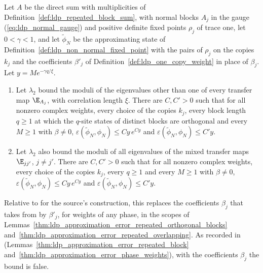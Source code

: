 \begin{lemma}
    \label{thm:ldp_approximation_error_one_copy}
    \leanok
    Let $A$ be the direct sum with multiplicities of
    Definition~\ref{def:ldp_repeated_block_sum}, with normal blocks $A_j$ in the gauge
    (\ref{eq:ldp_normal_gauge}) and positive definite fixed points $\rho_j$ of trace one,
    let $0<\gamma<1$, and let $\widetilde\phi_N$ be the approximating state of
    Definition~\ref{def:ldp_non_normal_fixed_point} with the pairs of $\rho_j$ on the
    copies $k_j$ and the coefficients $\beta'_j$ of
    Definition~\ref{def:ldp_one_copy_weight} in place of $\beta_j$. Let
    $y=Me^{-\gamma q/\xi}$.
    \begin{enumerate}
        \item Let $\lambda_2$ bound the moduli of the eigenvalues other than one of every
              transfer map $\E_{A_j}$, with correlation length $\xi$. There are
              $C,C'>0$ such that for all nonzero complex weights, every choice of the
              copies $k_j$, every block length $q\geq1$ at which the $q$-site
              states of distinct blocks are orthogonal and every $M\geq1$ with
              $\beta\neq0$, $\varepsilon(\widetilde\phi_N,\phi_N)\leq Cy\,e^{Cy}$ and
              $\varepsilon(\widetilde\phi_N,\phi_N)\leq C'y$.
        \item Let $\lambda_2$ also bound the moduli of all eigenvalues of the mixed
              transfer maps $\E_{jj'}$, $j\neq j'$. There are $C,C'>0$ such that for all
              nonzero complex weights, every choice of the copies $k_j$, every $q\geq1$
              and every $M\geq1$ with $\beta\neq0$,
              $\varepsilon(\widetilde\phi_N,\phi_N)\leq Cy\,e^{Cy}$ and
              $\varepsilon(\widetilde\phi_N,\phi_N)\leq C'y$.
    \end{enumerate}
    Relative to \cite[Lemma~1$'$(ii)]{Malz2024Preparation} for the source's construction,
    this replaces the coefficients $\beta_j$ that
    \cite[eq.~(S7)]{Malz2024Preparation} takes from
    \cite[eq.~(S4)]{Malz2024Preparation} by $\beta'_j$, for weights of any phase, in the
    scopes of Lemmas~\ref{thm:ldp_approximation_error_repeated_orthogonal_blocks}
    and~\ref{thm:ldp_approximation_error_repeated_overlapping}. As recorded in
    \cite{gap:mswc24_repeated_block_corrected_state}
    (Lemmas~\ref{thm:ldp_approximation_error_repeated_block}
    and~\ref{thm:ldp_approximation_error_phase_weights}), with the coefficients
    $\beta_j$ the bound is false.
\end{lemma}
